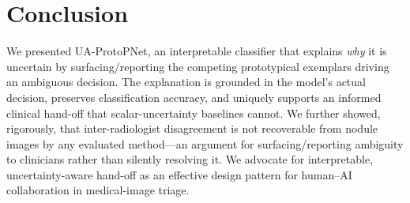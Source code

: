 \documentclass[10pt]{article}
\newcommand{\method}{UA-ProtoPNet}
\begin{document}
\section{Conclusion}

We presented \method{}, an interpretable classifier that explains \emph{why} it
is uncertain by surfacing/reporting the competing prototypical exemplars driving an
ambiguous decision. The explanation is grounded in the model's actual decision,
preserves classification accuracy, and uniquely supports an informed clinical
hand-off that scalar-uncertainty baselines cannot. We further showed, rigorously,
that inter-radiologist disagreement is not recoverable from nodule images by any
evaluated method---an argument for surfacing/reporting ambiguity to clinicians rather than
silently resolving it. We advocate for interpretable, uncertainty-aware hand-off as an effective
 design pattern for human–AI collaboration in medical-image triage.




\printbibliography
\end{document}
